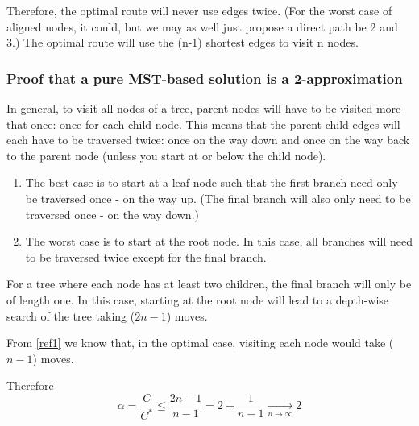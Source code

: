 \documentclass[11pt]{article}
\begin{document}
Therefore, the optimal route will never use edges twice.
(For the worst case of aligned nodes, it could, but we may as well just propose a 
direct path be 2 and 3.) The optimal route will use the (n-1) shortest edges to visit n nodes. \label{ref1}

\subsubsection{Proof that a pure MST-based solution is a 2-approximation}
In general, to visit all nodes of a tree, parent nodes will have to be visited more that once: once for each child node. This means that the parent-child edges will each have to be traversed twice: once on the way down and once on the way back to the parent node (unless you start at or below the child node).

\begin{enumerate}[label=•]
	\item The best case is to start at a leaf node such that the first branch need only be traversed once - on the way up. (The final branch will also only need to be traversed once - on the way down.)

	\item The worst case is to start at the root node. In this case, all branches will need to be traversed twice except for the final branch.
\end{enumerate}

For a tree where each node has at least two children, the final branch will only be of length one. In this case, starting at the root node will lead to a depth-wise search of the tree taking ($2n-1$) moves.

From \ref{ref1} we know that, in the optimal case, visiting each node would take ($n-1$) moves.

Therefore
\begin{equation}
	\alpha = \frac{C}{C^*} \leq \frac{2n-1}{n-1} = 2 + \frac{1}{n-1} \underset{n\to\infty}{\longrightarrow} 2
	\label{eq:1}
\end{equation}
\end{document}
